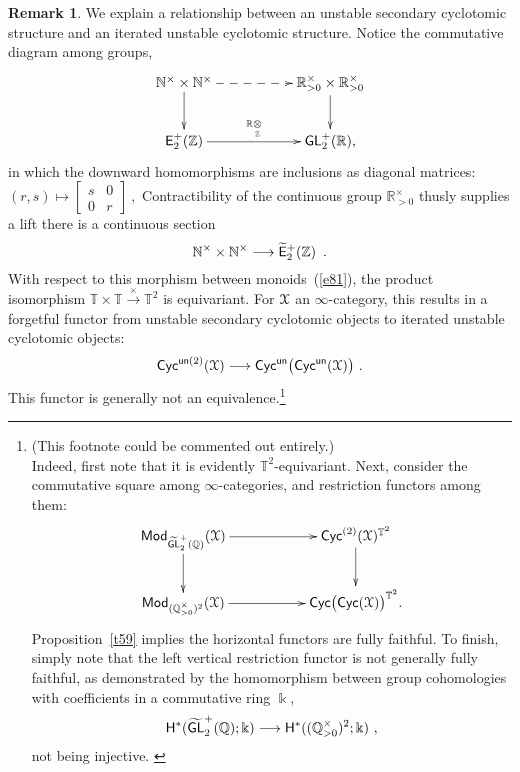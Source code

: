 \documentclass{amsart}
\theoremstyle{definition}
\newtheorem{remark}[theorem]{Remark}
\theoremstyle{remark}
\DeclareMathOperator{\Mod}{\sf Mod}
\def\ot{\otimes}
\newcommand{\w}{\widetilde}
\newcommand{\xra}{\xrightarrow}
\def\QQ{\mathbb Q}\def\RR{\mathbb R}\def\SS{\mathbb S}\def\TT{\mathbb T}
\def\sE{\mathsf E}\def\sF{\mathsf F}\def\sG{\mathsf G}\def\sH{\mathsf H}
\DeclareMathOperator{\Ebraid}{\w{\sf E}_{2}^{+}(\ZZ)}
\DeclareMathOperator{\GL}{\sf GL}
\DeclareMathOperator{\EpZ}{\sE^+_2(\ZZ)}
\begin{document}
\begin{remark}
\label{r3}
We explain a relationship between an unstable secondary cyclotomic structure and an iterated unstable cyclotomic structure.
Notice the commutative diagram among groups, 
\[
\xymatrix{
\NN^\times \times \NN^\times
\ar@{-->}[rr]
\ar[d]
&&
\RR_{>0}^{\times} \times \RR_{>0}^{\times}
\ar[d]
\\
\EpZ 
\ar[rr]^-{\RR\underset{\ZZ}\ot}
&&
\GL_2^+(\RR)
,
}
\]
in which the downward homomorphisms are inclusions as diagonal matrices:
$
(r,s)\mapsto \begin{bmatrix} s & 0 \\ 0 & r \end{bmatrix}
~,
$
Contractibility of the continuous group $\RR_{>0}^\times$ thusly supplies a lift
there is a continuous section 
\begin{equation}
\label{e81}
\NN^\times \times \NN^\times
\longrightarrow
\Ebraid
~.
\end{equation}
With respect to this morphism between monoids~(\ref{e81}), the product isomorphism $\TT\times \TT \xra{\times} \TT^2$ is equivariant. 
For $\mathcal X$ an $\infty$-category, this results in a forgetful functor from unstable secondary cyclotomic objects to iterated unstable cyclotomic objects:
\[
{\sf Cyc}^{{\sf un} (2)}(\mathcal X)
\longrightarrow
{\sf Cyc}^{\sf un}\bigl( {\sf Cyc}^{\sf un}(\mathcal X) \bigr)
~.
\]
This functor is generally not an equivalence.\footnote{
{\color{blue}
(This footnote could be commented out entirely.)
\\
Indeed, first note that it is evidently $\TT^2$-equivariant. 
Next, consider the commutative square among $\infty$-categories, and restriction functors among them:
\[
\xymatrix{
\Mod_{\w{\GL}_2^+(\QQ)}(\cX)
\ar[rr]
\ar[d]
&&
{\sf Cyc}^{(2)}(\cX)^{\TT^2}
\ar[d]
\\
\Mod_{ (\QQ_{>0}^{\times})^2 }(\cX)
\ar[rr]
&&
{\sf Cyc}\bigl( {\sf Cyc}(\cX) \bigr) ^{\TT^2}
.
}
\]
Proposition~\ref{t59} implies the horizontal functors are fully faithful.  
To finish, simply note that the left vertical restriction functor is not generally fully faithful, as demonstrated by the homomorphism between group cohomologies with coefficients in a commutative ring $\Bbbk$, 
\[
\sH^\ast( \w{\GL}_2^+(\QQ) ;  \Bbbk )
\longrightarrow
\sH^\ast( ( \QQ_{>0}^\times)^2 ; \Bbbk )
~,
\]
not being injective. 
}
}
\end{remark}
\end{document}
